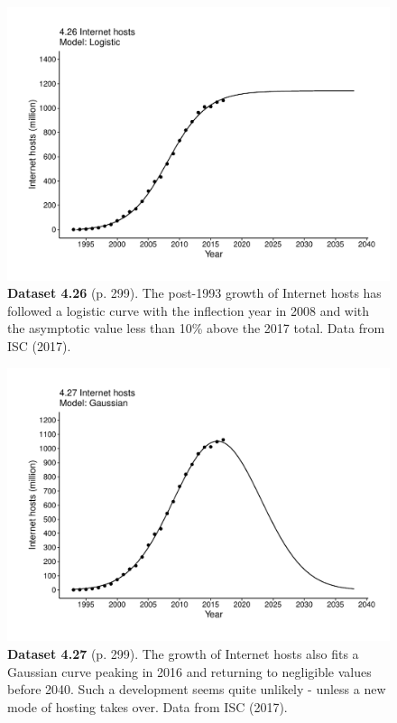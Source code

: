 \documentclass[aps,rmp,preprint,superscriptaddress,10pt,onecolumn]{article}
\begin{document}
\clearpage
\begin{figure}[h]
\includegraphics[width=\textwidth]{output/figs-ggplot/4.26.pdf}
\caption*{\textbf{Dataset 4.26} (p. 299). The post-1993 growth of Internet hosts has followed a logistic curve with the inflection year in 2008 and with the asymptotic value less than 10\% above the 2017 total. Data from ISC (2017). }
\end{figure}
	
\clearpage
\begin{figure}[h]
\includegraphics[width=\textwidth]{output/figs-ggplot/4.27.pdf}
\caption*{\textbf{Dataset 4.27} (p. 299). The growth of Internet hosts also fits a Gaussian curve peaking in 2016 and returning to negligible values before 2040. Such a development seems quite unlikely - unless a new mode of hosting takes over. Data from ISC (2017).}
\end{figure}
	
\end{document}
